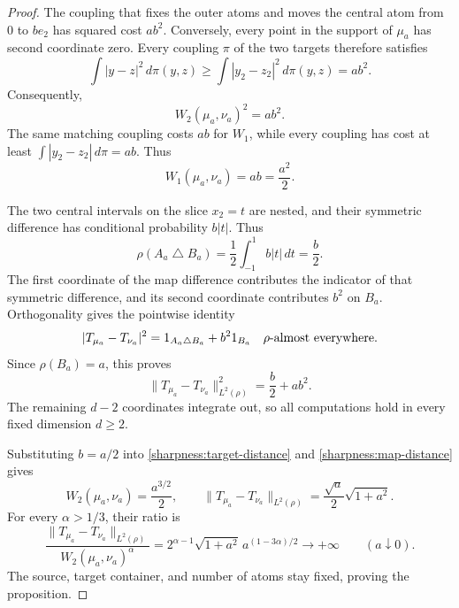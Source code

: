 \begin{proof}
The coupling that fixes the outer atoms and moves the central atom
from $0$ to $be_2$ has squared cost $ab^2$.  Conversely, every point
in the support of $\mu_a$ has second coordinate zero.  Every coupling
$\pi$ of the two targets therefore satisfies
\[
 \int|y-z|^2\,d\pi(y,z)
 \ge\int|y_2-z_2|^2\,d\pi(y,z)=ab^2.
\]
Consequently,
\begin{equation}\label{sharpness:target-distance}
 W_2(\mu_a,\nu_a)^2=ab^2.
\end{equation}
The same matching coupling costs $ab$ for $W_1$, while every coupling
has cost at least
$\int|y_2-z_2|\,d\pi=ab$. Thus
\begin{equation}\label{sharpness:w1-distance}
 W_1(\mu_a,\nu_a)=ab=\frac{a^2}{2}.
\end{equation}

The two central intervals on the slice $x_2=t$ are nested, and their
symmetric difference has conditional probability $b|t|$.  Thus
\[
 \rho(A_a\mathbin{\triangle}B_a)
 =\frac12\int_{-1}^1b|t|\,dt=\frac b2.
\]
The first coordinate of the map difference contributes the indicator
of that symmetric difference, and its second coordinate contributes
$b^2$ on $B_a$.  Orthogonality gives the pointwise identity
\[
 |T_{\mu_a}-T_{\nu_a}|^2
 =1_{A_a\mathbin{\triangle}B_a}+b^2 1_{B_a}
 \quad\rho\hbox{-almost everywhere}.
\]
Since $\rho(B_a)=a$, this proves
\begin{equation}\label{sharpness:map-distance}
 \|T_{\mu_a}-T_{\nu_a}\|_{L^2(\rho)}^2=\frac b2+ab^2.
\end{equation}
The remaining $d-2$ coordinates integrate out, so all computations
hold in every fixed dimension $d\ge2$.

Substituting $b=a/2$ into \eqref{sharpness:target-distance} and
\eqref{sharpness:map-distance} gives
\[
 W_2(\mu_a,\nu_a)=\frac{a^{3/2}}2,
 \qquad
 \|T_{\mu_a}-T_{\nu_a}\|_{L^2(\rho)}
 =\frac{\sqrt a}{2}\sqrt{1+a^2}.
\]
For every $\alpha>1/3$, their ratio is
\[
 \frac{\|T_{\mu_a}-T_{\nu_a}\|_{L^2(\rho)}}
      {W_2(\mu_a,\nu_a)^\alpha}
 =2^{\alpha-1}\sqrt{1+a^2}\,a^{(1-3\alpha)/2}
 \longrightarrow+\infty\qquad(a\downarrow0).
\]
The source, target container, and number of atoms stay fixed,
proving the proposition.
\end{proof}

